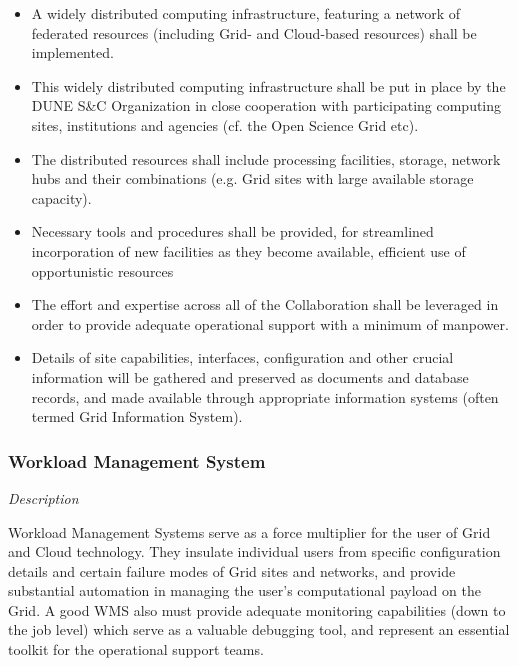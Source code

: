 \begin{itemize}
	\item A widely distributed computing infrastructure, featuring a network of federated resources (including Grid- and Cloud-based resources) shall be implemented.
	
	\item This widely distributed computing infrastructure shall be put in place by the DUNE S\&C Organization in close cooperation with participating computing sites, institutions and agencies (cf. the Open Science Grid etc).

	
	\item The distributed resources shall include processing facilities, storage, network hubs and their combinations (e.g. Grid sites with large available storage capacity).
	
	\item Necessary tools and procedures shall be provided, for streamlined incorporation of new facilities as they become available, efficient use of opportunistic resources 
	
	\item The effort and expertise across all of the Collaboration shall be leveraged in order to provide adequate operational support with a minimum of manpower.
	
	\item Details of site capabilities, interfaces, configuration and other crucial information will be gathered and preserved as documents and database records, and made available through appropriate information systems (often termed Grid Information System).
\end{itemize}

\subsubsection{Workload Management System}
\textit{Description}

Workload Management Systems serve as a force multiplier for the user of Grid and Cloud technology. They insulate individual users from specific configuration details and certain failure modes of Grid sites and networks, and provide substantial automation in managing the user's computational payload on the Grid. A good WMS also must provide adequate monitoring capabilities (down to the job level) which serve as a valuable debugging tool, and represent an essential toolkit for the operational support teams.

